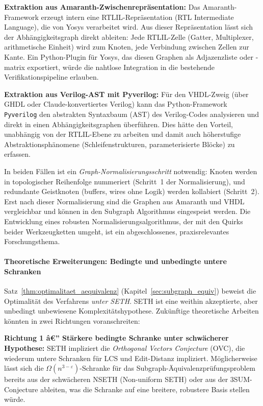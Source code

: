 ﻿\documentclass[12pt,a4paper]{report}
\begin{document}
\textbf{Extraktion aus Amaranth-Zwischenrepräsentation:} Das Amaranth-Framework
erzeugt intern eine RTLIL-Repräsentation (RTL Intermediate Language), die von Yosys
verarbeitet wird. Aus dieser Repräsentation lässt sich der Abhängigkeitsgraph direkt
ableiten: Jede RTLIL-Zelle (Gatter, Multiplexer, arithmetische Einheit) wird zum
Knoten, jede Verbindung zwischen Zellen zur Kante. Ein Python-Plugin für Yosys, das
diesen Graphen als Adjazenzliste oder -matrix exportiert, würde die nahtlose Integration
in die bestehende Verifikationspipeline erlauben.

\textbf{Extraktion aus Verilog-AST mit Pyverilog:} Für den VHDL-Zweig (über GHDL oder
Claude-konvertiertes Verilog) kann das Python-Framework \texttt{Pyverilog} den
abstrakten Syntaxbaum (AST) des Verilog-Codes analysieren und direkt in einen
Abhängigkeitsgraphen überführen. Dies hätte den Vorteil, unabhängig von der
RTLIL-Ebene zu arbeiten und damit auch höherstufige Abstraktionsphänomene
(Schleifenstrukturen, parameterisierte Blöcke) zu erfassen.

In beiden Fällen ist ein \emph{Graph-Normalisierungsschritt} notwendig: Knoten werden
in topologischer Reihenfolge nummeriert (Schritt~1 der Normalisierung), und redundante
Geistknoten (buffers, wires ohne Logik) werden kollabiert (Schritt~2). Erst nach dieser
Normalisierung sind die Graphen aus Amaranth und VHDL vergleichbar und können in den
Subgraph Algorithmus eingespeist werden. Die Entwicklung eines robusten
Normalisierungsalgorithmus, der mit den Quirks beider Werkzeugketten umgeht, ist
ein abgeschlossenes, praxisrelevantes Forschungsthema.

\paragraph{Theoretische Erweiterungen: Bedingte und unbedingte untere Schranken}

Satz~\ref{thm:optimalitaet_aequivalenz} (Kapitel~\ref{sec:subgraph_equiv}) beweist die
Optimalität des Verfahrens \emph{unter SETH}. SETH ist eine weithin akzeptierte, aber
unbedingt unbewiesene Komplexitätshypothese. Zukünftige theoretische Arbeiten könnten
in zwei Richtungen voranschreiten:

\textbf{Richtung 1 â€” Stärkere bedingte Schranke unter schwächerer Hypothese:}
SETH impliziert die \emph{Orthogonal Vectors Conjecture} (OVC), die wiederum untere
Schranken für LCS und Edit-Distanz impliziert. Möglicherweise lässt sich die
$\Omega(n^{3-\varepsilon})$-Schranke für das Subgraph-Äquivalenzprüfungsproblem
bereits aus der schwächeren NSETH (Non-uniform SETH) oder aus der
3SUM-Conjecture ableiten, was die Schranke auf eine breitere, robustere Basis stellen würde.
\end{document}
